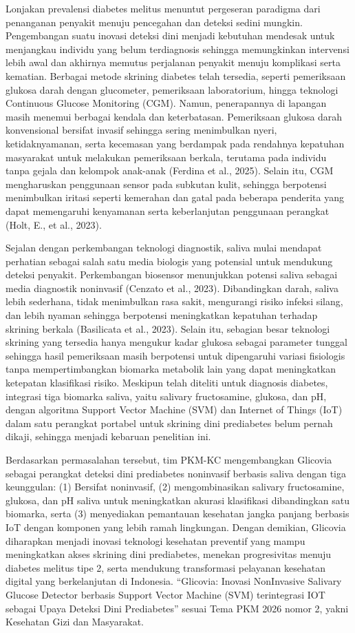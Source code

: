 \documentclass[a4paper,12pt]{article}
\begin{document}
Lonjakan prevalensi diabetes melitus menuntut pergeseran paradigma dari penanganan penyakit menuju pencegahan dan deteksi sedini mungkin. Pengembangan suatu inovasi deteksi dini menjadi kebutuhan mendesak untuk menjangkau individu yang belum terdiagnosis sehingga memungkinkan intervensi lebih awal dan akhirnya memutus perjalanan penyakit menuju komplikasi serta kematian. Berbagai metode skrining diabetes telah tersedia, seperti pemeriksaan glukosa darah dengan glucometer, pemeriksaan laboratorium, hingga teknologi Continuous Glucose Monitoring (CGM). Namun, penerapannya di lapangan masih menemui berbagai kendala dan keterbatasan. Pemeriksaan glukosa darah konvensional bersifat invasif sehingga sering menimbulkan nyeri, ketidaknyamanan, serta kecemasan yang berdampak pada rendahnya kepatuhan masyarakat untuk melakukan pemeriksaan berkala, terutama pada individu tanpa gejala dan kelompok anak-anak (Ferdina et al., 2025). Selain itu, CGM mengharuskan penggunaan sensor pada subkutan kulit, sehingga berpotensi menimbulkan iritasi seperti kemerahan dan gatal pada beberapa penderita yang dapat memengaruhi kenyamanan serta keberlanjutan penggunaan perangkat (Holt, E., et al., 2023).

Sejalan dengan perkembangan teknologi diagnostik, saliva mulai mendapat perhatian sebagai salah satu media biologis yang potensial untuk mendukung deteksi penyakit. Perkembangan biosensor menunjukkan potensi saliva sebagai media diagnostik noninvasif (Cenzato et al., 2023). Dibandingkan darah, saliva lebih sederhana, tidak menimbulkan rasa sakit, mengurangi risiko infeksi silang, dan lebih nyaman sehingga berpotensi meningkatkan kepatuhan terhadap skrining berkala (Basilicata et al., 2023). Selain itu, sebagian besar teknologi skrining yang tersedia hanya mengukur kadar glukosa sebagai parameter tunggal sehingga hasil pemeriksaan masih berpotensi untuk dipengaruhi variasi fisiologis tanpa mempertimbangkan biomarka metabolik lain yang dapat meningkatkan ketepatan klasifikasi risiko. Meskipun telah diteliti untuk diagnosis diabetes, integrasi tiga biomarka saliva, yaitu salivary fructosamine, glukosa, dan pH, dengan algoritma Support Vector Machine (SVM) dan Internet of Things (IoT) dalam satu perangkat portabel untuk skrining dini prediabetes belum pernah dikaji, sehingga menjadi kebaruan penelitian ini.

Berdasarkan permasalahan tersebut, tim PKM-KC mengembangkan Glicovia sebagai perangkat deteksi dini prediabetes noninvasif berbasis saliva dengan tiga keunggulan: (1) Bersifat noninvasif, (2) mengombinasikan salivary fructosamine, glukosa, dan pH saliva untuk meningkatkan akurasi klasifikasi dibandingkan satu biomarka, serta (3) menyediakan pemantauan kesehatan jangka panjang berbasis IoT dengan komponen yang lebih ramah lingkungan. Dengan demikian, Glicovia diharapkan menjadi inovasi teknologi kesehatan preventif yang mampu meningkatkan akses skrining dini prediabetes, menekan progresivitas menuju diabetes melitus tipe 2, serta mendukung transformasi pelayanan kesehatan digital yang berkelanjutan di Indonesia. “Glicovia: Inovasi NonInvasive Salivary Glucose Detector berbasis Support Vector Machine (SVM) terintegrasi IOT sebagai Upaya Deteksi Dini Prediabetes” sesuai Tema PKM 2026 nomor 2, yakni Kesehatan Gizi dan Masyarakat.
\end{document}
